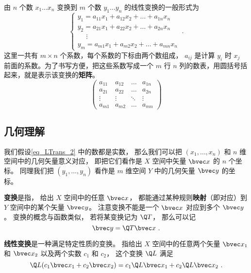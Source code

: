 由 $n$ 个数 $x_1 \ldots x_n$ 变换到 $m$ 个数 $y_1 \ldots y_n$ 的线性变换的一般形式为
\begin{equation}\label{eq_LTrans_2}
\begin{cases}
y_1 = a_{11} x_1 + a_{12} x_2 + \ldots + a_{1n} x_n\\
y_2 = a_{21} x_1 + a_{22} x_2 + \ldots + a_{2n} x_n\\
\quad\; \vdots \\
y_m = a_{m1} x_1 + a_{m2} x_2 + \ldots + a_{mn} x_n
\end{cases}~.
\end{equation} 
这里一共有 $m \times n$ 个系数，每个系数的下标由两个数组成， $a_{ij}$ 是计算 $y_i$ 时 $x_j$ 前面的系数。为了书写方便，把这些系数写成一个 $m$ 行 $n$ 列的数表，用圆括号括起来，就是表示该变换的\textbf{矩阵}。
\begin{equation}\begin{pmatrix}
a_{11} & a_{12} & \ldots & a_{1n}\\
a_{21} & a_{22} & \ldots & a_{2n}\\
 \vdots & \vdots & \ddots & \vdots \\
a_{m1} & a_{m2} & \ldots & a_{mn}
\end{pmatrix}\end{equation} 

\subsection{几何理解}

我们假设\autoref{eq_LTrans_2} 中的数都是实数， 那么我们可以把 $(x_1, \dots, x_n)$ 和 $n$ 维空间中的几何矢量意义对应， 即把它们看作是 $X$ 空间中矢量 $\bvec x$ 的 $n$ 个坐标。 同理我们把 $(y_1, \dots, y_n)$ 看作是 $m$ 维空间 $Y$ 中的几何矢量 $\bvec y$ 的坐标。

\textbf{变换}是指， 给出 $X$ 空间中的任意 $\bvec x$， 都能通过某种规则\textbf{映射}（即对应）到 $Y$ 空间中的某个矢量 $\bvec y$。 注意变换不能是一个 $\bvec x$ 对应到多个 $\bvec y$。 变换的概念与函数类似， 若将某变换记为 $\Q T$， 那么可以记
\begin{equation}
\bvec y = \Q T\bvec x~.
\end{equation}

\textbf{线性变换}是一种满足特定性质的变换。 指给出 $X$ 空间中的任意两个矢量 $\bvec x_1$ 和 $\bvec x_2$ 以及两个实数 $c_1$ 和 $c_2$， 这个变换 $\Q L$ 满足
\begin{equation}
\Q L(c_1 \bvec x_1 + c_2 \bvec x_2) = c_1 \Q L \bvec x_1 + c_2 \Q L \bvec x_2~.
\end{equation}

